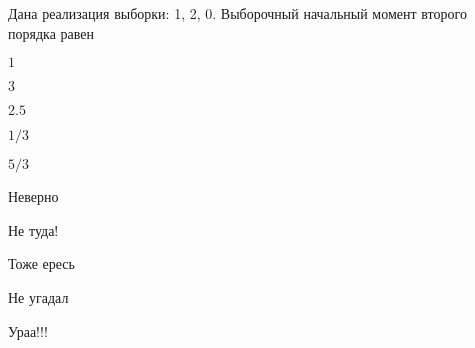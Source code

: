 
\begin{question}
Дана реализация выборки: 1, 2, 0. Выборочный начальный момент второго
порядка равен
\begin{answerlist}
  \item \(1\)
  \item \(3\)
  \item \(2.5\)
  \item \(1/3\)
  \item \(5/3\)
\end{answerlist}
\end{question}

\begin{solution}
\begin{answerlist}
  \item Неверно
  \item Не туда!
  \item Тоже ересь
  \item Не угадал
  \item Ураа!!!
\end{answerlist}
\end{solution}

